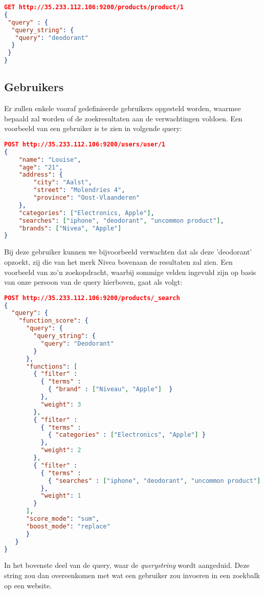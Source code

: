 \begin{lstlisting}[language=json,basicstyle=\small,firstnumber=1]
GET http://35.233.112.106:9200/products/product/1 
{
 "query" : {
  "query_string": {
   "query": "deodorant"
  }
 }
}
\end{lstlisting}

\subsection{Gebruikers}

Er zullen enkele vooraf gedefinieerde gebruikers opgesteld worden, waarmee bepaald zal worden of de zoekresultaten aan de verwachtingen voldoen. Een voorbeeld van een gebruiker is te zien in volgende query:
\begin{lstlisting}[language=json,basicstyle=\small,firstnumber=1]
POST http://35.233.112.106:9200/users/user/1
{
	"name": "Louise",
	"age": "21",
	"address": {
		"city": "Aalst",
		"street": "Molendries 4",
		"province": "Oost-Vlaanderen"
	},
	"categories": ["Electronics, Apple"],
	"searches": ["iphone", "deodorant", "uncommon product"],
	"brands": ["Nivea", "Apple"]
}
\end{lstlisting}

Bij deze gebruiker kunnen we bijvoorbeeld verwachten dat als deze 'deodorant' opzoekt, zij die van het merk Nivea bovenaan de resultaten zal zien. Een voorbeeld van zo'n zoekopdracht, waarbij sommige velden ingevuld zijn op basis van onze persoon van de query hierboven, gaat als volgt:

\begin{lstlisting}[language=json,basicstyle=\small,firstnumber=1]
POST http://35.233.112.106:9200/products/_search
{
  "query": {
    "function_score": {
      "query": {
        "query_string": {
          "query": "Deodorant"
        }
      },
      "functions": [
        { "filter" : 
          { "terms" : 
            { "brand" : ["Niveau", "Apple"]  } 
          },
          "weight": 3
        },
        { "filter" : 
          { "terms" : 
            { "categories" : ["Electronics", "Apple"] }
          },
          "weight": 2
        },
        { "filter" : 
          { "terms" : 
            { "searches" : ["iphone", "deodorant", "uncommon product"] } 
          },
          "weight": 1
        }
      ],
      "score_mode": "sum",
      "boost_mode": "replace"
      }
   }
}
\end{lstlisting}

In het bovenste deel van de query, waar de \textit{query\textunderscore string} wordt aangeduid. Deze string zou dan overeenkomen met wat een gebruiker zou invoeren in een zoekbalk op een website.


